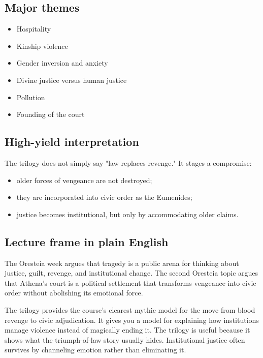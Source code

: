 \documentclass[11pt]{article}
\begin{document}
\subsection{Major themes}

\begin{itemize}
\item Hospitality
\item Kinship violence
\item Gender inversion and anxiety
\item Divine justice versus human justice
\item Pollution
\item Founding of the court
\end{itemize}

\subsection{High-yield interpretation}

The trilogy does not simply say "law replaces revenge." It stages a compromise:

\begin{itemize}
\item older forces of vengeance are not destroyed;
\item they are incorporated into civic order as the Eumenides;
\item justice becomes institutional, but only by accommodating older claims.
\end{itemize}

\subsection{Lecture frame in plain English}

The Oresteia week argues that tragedy is a public arena for thinking about justice, guilt, revenge, and institutional change. The second Oresteia topic argues that Athena's court is a political settlement that transforms vengeance into civic order without abolishing its emotional force.

The trilogy provides the course's clearest mythic model for the move from blood revenge to civic adjudication. It gives you a model for explaining how institutions manage violence instead of magically ending it. The trilogy is useful because it shows what the triumph-of-law story usually hides. Institutional justice often survives by channeling emotion rather than eliminating it.
\end{document}

